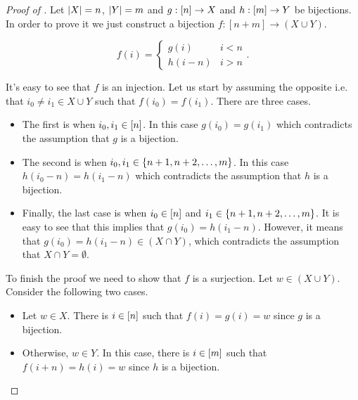 \begin{proof}[Proof of ]
  Let $\left|{X}\right| = n$, $\left|{Y}\right| = m$ and $g : {[{n}]} \to X$ and $h : {[{m}]} \to Y$ be
  bijections. In order to prove it we just construct a bijection
  $f : [n + m] \to (X \cup Y)$.

  \[
    f(i) =
    \begin{cases}
        g(i) & i < n \\
        h(i  - n) & i > n
    \end{cases}.
  \]

  It's easy to see that $f$ is an injection. Let us start by assuming the opposite i.e.
  that $i_0 \neq i_1 \in X \cup Y$ such that $f(i_0) = f(i_1)$.
  There are three cases.
  \begin{itemize}
    \item The first is when $i_0, i_1 \in {[{n}]}$. In this case $g(i_0) = g(i_1)$
      which contradicts the assumption that $g$ is a bijection.
    \item The second is when $i_0, i_1 \in \set{n + 1, n + 2, \dots, m}$.
      In this case $h(i_0 - n) = h(i_1 - n)$ which contradicts the assumption
      that $h$ is a bijection.
    \item Finally, the last case is when $i_0 \in {[{n}]}$ and
      $i_1 \in \set{n + 1, n + 2, \dots, m}$. It is easy to see that this
      implies that $g(i_0) = h(i_1 - n)$. However, it
      means that $g(i_0) = h(i_1 - n) \in (X \cap Y)$, which contradicts the
      assumption that $X \cap Y = \emptyset$.
  \end{itemize}

  To finish the proof we need to show that $f$ is a surjection. Let
  $w \in (X \cup Y)$. Consider the following two cases.
  \begin{itemize}
    \item Let $w \in X$. There is $i \in {[{n}]}$ such that $f(i) = g(i) = w$ since
      $g$ is a bijection.
    \item Otherwise, $w \in Y$. In this case, there is $i \in {[{m}]}$ such that
      $f(i + n) = h(i) = w$ since $h$ is a bijection.
  \end{itemize}
\end{proof}

